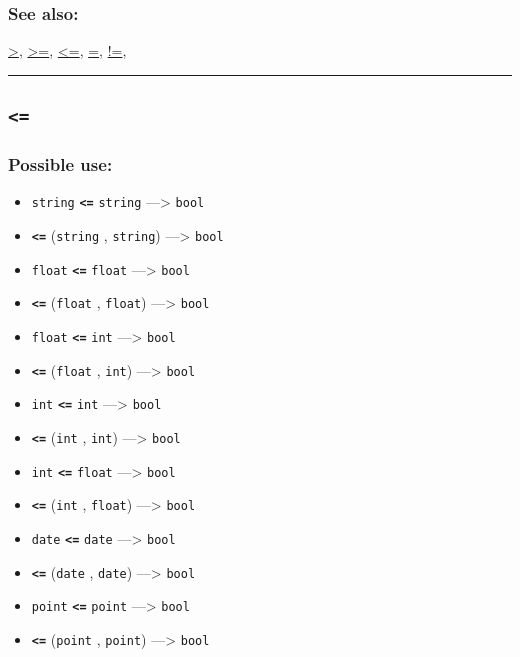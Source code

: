 \documentclass[]{book}
\providecommand{\tightlist}{%
  \setlength{\itemsep}{0pt}\setlength{\parskip}{0pt}}
\theoremstyle{definition}
\theoremstyle{definition}
\theoremstyle{definition}
\theoremstyle{remark}
\begin{document}
\subsubsection{See also:}\label{see-also-9}

\href{OperatorsAA\#\%3E}{\textgreater{}},
\href{OperatorsAA\#\%3E=}{\textgreater{}=},
\href{OperatorsAA\#\%3C=}{\textless{}=}, \href{OperatorsAA\#=}{=},
\href{OperatorsAA\#!=}{!=},

\begin{center}\rule{0.5\linewidth}{\linethickness}\end{center}

\subsection{\texorpdfstring{\texttt{\textless{}=}}{\textless{}=}}\label{section-14}

\subsubsection{Possible use:}\label{possible-use-12}

\begin{itemize}
\tightlist
\item
  \texttt{string} \textbf{\texttt{\textless{}=}} \texttt{string}
  ---\textgreater{} \texttt{bool}
\item
  \textbf{\texttt{\textless{}=}} (\texttt{string} , \texttt{string})
  ---\textgreater{} \texttt{bool}
\item
  \texttt{float} \textbf{\texttt{\textless{}=}} \texttt{float}
  ---\textgreater{} \texttt{bool}
\item
  \textbf{\texttt{\textless{}=}} (\texttt{float} , \texttt{float})
  ---\textgreater{} \texttt{bool}
\item
  \texttt{float} \textbf{\texttt{\textless{}=}} \texttt{int}
  ---\textgreater{} \texttt{bool}
\item
  \textbf{\texttt{\textless{}=}} (\texttt{float} , \texttt{int})
  ---\textgreater{} \texttt{bool}
\item
  \texttt{int} \textbf{\texttt{\textless{}=}} \texttt{int}
  ---\textgreater{} \texttt{bool}
\item
  \textbf{\texttt{\textless{}=}} (\texttt{int} , \texttt{int})
  ---\textgreater{} \texttt{bool}
\item
  \texttt{int} \textbf{\texttt{\textless{}=}} \texttt{float}
  ---\textgreater{} \texttt{bool}
\item
  \textbf{\texttt{\textless{}=}} (\texttt{int} , \texttt{float})
  ---\textgreater{} \texttt{bool}
\item
  \texttt{date} \textbf{\texttt{\textless{}=}} \texttt{date}
  ---\textgreater{} \texttt{bool}
\item
  \textbf{\texttt{\textless{}=}} (\texttt{date} , \texttt{date})
  ---\textgreater{} \texttt{bool}
\item
  \texttt{point} \textbf{\texttt{\textless{}=}} \texttt{point}
  ---\textgreater{} \texttt{bool}
\item
  \textbf{\texttt{\textless{}=}} (\texttt{point} , \texttt{point})
  ---\textgreater{} \texttt{bool}
\end{itemize}
\end{document}

